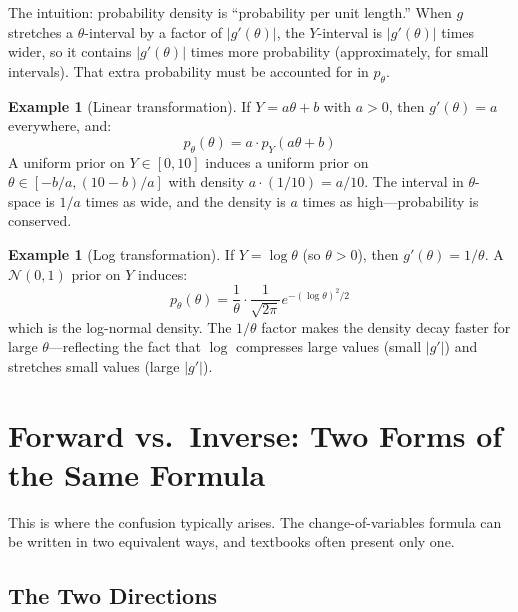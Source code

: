 \documentclass[11pt,a4paper]{article}
\theoremstyle{definition}
\newtheorem{example}[theorem]{Example}
\newcommand{\Normal}{\mathcal{N}}
\begin{document}
The intuition: probability density is ``probability per unit length.'' When $g$
stretches a $\theta$-interval by a factor of $|g'(\theta)|$, the $Y$-interval
is $|g'(\theta)|$ times wider, so it contains $|g'(\theta)|$ times more
probability (approximately, for small intervals). That extra probability must
be accounted for in $p_\theta$.

\begin{example}[Linear transformation]
If $Y = a\theta + b$ with $a > 0$, then $g'(\theta) = a$ everywhere, and:
\begin{equation}
    p_\theta(\theta) = a \cdot p_Y(a\theta + b)
\end{equation}
A uniform prior on $Y \in [0, 10]$ induces a uniform prior on
$\theta \in [-b/a, (10-b)/a]$ with density $a \cdot (1/10) = a/10$. The
interval in $\theta$-space is $1/a$ times as wide, and the density is $a$
times as high---probability is conserved.
\end{example}

\begin{example}[Log transformation]
\label{ex:log}
If $Y = \log \theta$ (so $\theta > 0$), then $g'(\theta) = 1/\theta$. A
$\Normal(0, 1)$ prior on $Y$ induces:
\begin{equation}
    p_\theta(\theta) = \frac{1}{\theta} \cdot \frac{1}{\sqrt{2\pi}}
    e^{-(\log\theta)^2/2}
\end{equation}
which is the log-normal density. The $1/\theta$ factor makes the density
decay faster for large $\theta$---reflecting the fact that $\log$ compresses
large values (small $|g'|$) and stretches small values (large $|g'|$).
\end{example}


\section{Forward vs.\ Inverse: Two Forms of the Same Formula}
\label{sec:forward_vs_inverse}

This is where the confusion typically arises. The change-of-variables formula
can be written in two equivalent ways, and textbooks often present only one.

\subsection{The Two Directions}
\end{document}
